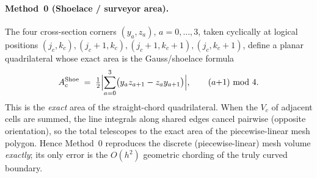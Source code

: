 \documentclass[11pt]{article}
\theoremstyle{definition}
\theoremstyle{remark}
\begin{document}
\paragraph{Method~0 (Shoelace / surveyor area).}
The four cross-section corners $(y_a,z_a)$, $a=0,\dots,3$, taken cyclically at
logical positions $(j_c,k_c),(j_c{+}1,k_c),(j_c{+}1,k_c{+}1),(j_c,k_c{+}1)$,
define a planar quadrilateral whose exact area is the Gauss/shoelace formula
\begin{equation}
A_c^{\mathrm{Shoe}}
\;=\;\tfrac12\Bigl|\sum_{a=0}^{3}\bigl(y_a z_{a+1}-z_a y_{a+1}\bigr)\Bigr|,
\qquad (a{+}1)\ \mathrm{mod}\ 4 .
\label{eq:shoelace}
\end{equation}
This is the \emph{exact} area of the straight-chord quadrilateral. When the $V_c$
of adjacent cells are summed, the line integrals along shared edges cancel
pairwise (opposite orientation), so the total telescopes to the exact area of the
piecewise-linear mesh polygon. Hence Method~0 reproduces the discrete
(piecewise-linear) mesh volume \emph{exactly}; its only error is the $O(h^2)$
geometric chording of the truly curved boundary.
\end{document}
